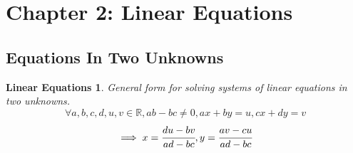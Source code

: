\section{Chapter 2: Linear Equations}
\subsection{Equations In Two Unknowns}
\theoremstyle{plain}
\newtheorem{linearEquations}{Linear Equations}[section]
\begin{linearEquations}
General form for solving systems of linear equations in two unknowns.
\[
\forall a, b, c, d, u, v \in \mathbb{R}, ab - bc \neq 0, ax + by = u, cx + dy = v
\]
\[
\implies x = \cfrac{du - bv}{ad - bc}, y = \cfrac{av - cu}{ad - bc}
\]
\end{linearEquations}
